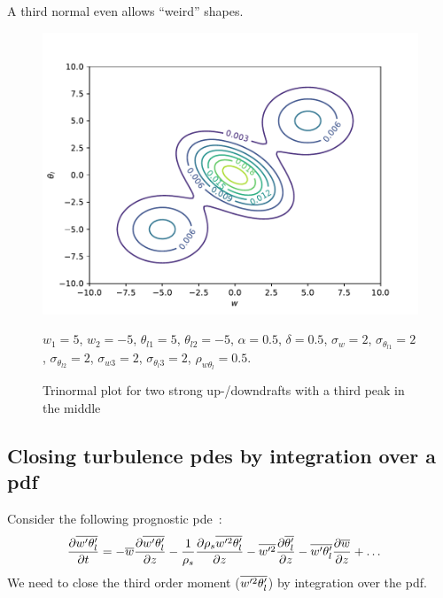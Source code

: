 \documentclass[10pt]{beamer}
\numberwithin{equation}{section}
\begin{document}
    \begin{frame}
        \begin{large}
            A third normal even allows \enquote{weird} shapes.
        \end{large}
        \begin{figure}[!htb]
            \centering
            \includegraphics[width=.5\textwidth]{include/figures/plot4}
            \caption{Trinormal plot for two strong up-/downdrafts with a third peak in the middle}
            \label{fig:plot4}
            $w_1 = 5$, $w_2 = -5$, $\theta_{l1} = 5$, $\theta_{l2} = -5$,
            $\alpha = 0.5$, $\delta=0.5$, $\sigma_w = 2$, $\sigma_{\theta_{l1}} = 2$,
            $\sigma_{\theta_{l2}} = 2$, $\sigma_{w3} = 2$, $\sigma_{\theta_l 3} = 2$,
            $\rho_{w\theta_l} = 0.5$.
        \end{figure}
    \end{frame}

    \subsection{Closing turbulence pdes by integration over a pdf}
    \label{subsec:closing-turbulence-pdes-by-integration-over-a-pdf}

    \begin{frame}
        Consider the following prognostic pde~\autocite[p. 21]{larson2022clubbsilhs}:
        \begin{align*}
            \frac{\partial \overline{w' \theta_l'}}{\partial t}
            &= -\overline{w}\frac{\partial \overline{w' \theta_l'}}{\partial z}
            - \frac{1}{\rho_s} \frac{\partial \rho_s \overline{w'^2 \theta_l'}}{\partial z}
            - \overline{w'^2} \frac{\partial \overline{\theta_l'}}{\partial z}
            - \overline{w' \theta_l'} \frac{\partial \overline{w}}{\partial z}
            + \ldots
        \end{align*}
        We need to close the third order moment ($\overline{w'^2 \theta_l'}$) by integration over the pdf.
    \end{frame}
\end{document}
